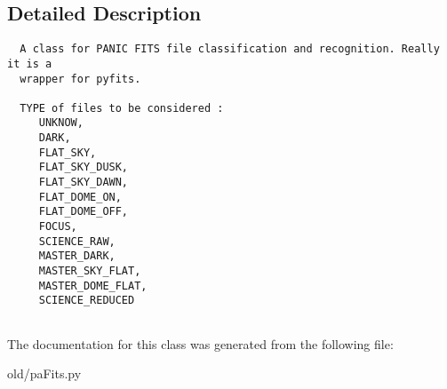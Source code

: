 \subsection{Detailed Description}


\footnotesize\begin{verbatim}
  A class for PANIC FITS file classification and recognition. Really it is a
  wrapper for pyfits.

  TYPE of files to be considered :
     UNKNOW,
     DARK,
     FLAT_SKY,
     FLAT_SKY_DUSK,
     FLAT_SKY_DAWN,
     FLAT_DOME_ON,
     FLAT_DOME_OFF,
     FOCUS,
     SCIENCE_RAW,
     MASTER_DARK,
     MASTER_SKY_FLAT,
     MASTER_DOME_FLAT,
     SCIENCE_REDUCED
     
\end{verbatim}
\normalsize
 



The documentation for this class was generated from the following file:\begin{CompactItemize}
\item 
old/pa\-Fits.py\end{CompactItemize}
